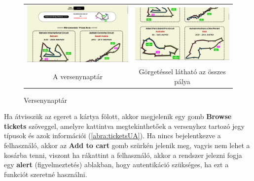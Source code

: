 \begin{figure}[!h]
	\centering
	\begin{tabular}{cc}
	\includegraphics[scale=0.15]{images/schedule1} &
	\includegraphics[scale=0.15]{images/schedule2} \\
	A versenynaptár & Görgetéssel látható az összes pálya
	\end{tabular}
	\caption{Versenynaptár}
	\label{abra:schedule}
\end{figure}

Ha átvisszük az egeret a kártya fölott, akkor megjelenik egy gomb \textbf{Browse tickets} szöveggel, amelyre kattintva megtekinthetőek a versenyhez tartozó jegy típusok és azok információi (\ref{abra:ticketsUA}). Ha nincs bejelentkezve a felhasználó, akkor az \textbf{Add to cart} gomb szürkén jelenik meg, vagyis nem lehet a kosárba tenni, viszont ha rákattint a felhasználó, akkor a rendszer jelezni fogja egy \textbf{alert} (figyelmeztetés) ablakban, hogy autentikáció szükséges, ha ezt a funkciót szeretné használni.

